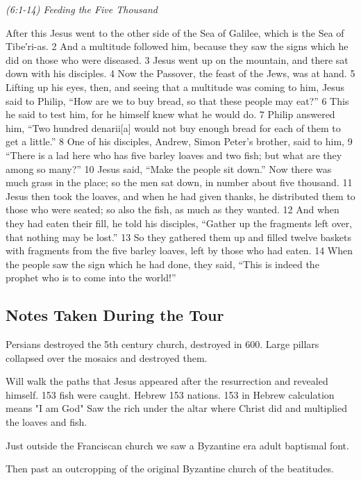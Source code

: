 \documentclass[letterpaper]{report}
\begin{document}
{\centering
	\emph{(6:1-14) Feeding the Five Thousand}\\
}
\begin{multicols}{2}
After this Jesus went to the other side of the Sea of Galilee, which is the Sea of Tibe′ri-as. 2 And a multitude followed him, because they saw the signs which he did on those who were diseased. 3 Jesus went up on the mountain, and there sat down with his disciples. 4 Now the Passover, the feast of the Jews, was at hand. 5 Lifting up his eyes, then, and seeing that a multitude was coming to him, Jesus said to Philip, “How are we to buy bread, so that these people may eat?” 6 This he said to test him, for he himself knew what he would do. 7 Philip answered him, “Two hundred denarii[a] would not buy enough bread for each of them to get a little.” 8 One of his disciples, Andrew, Simon Peter’s brother, said to him, 9 “There is a lad here who has five barley loaves and two fish; but what are they among so many?” 10 Jesus said, “Make the people sit down.” Now there was much grass in the place; so the men sat down, in number about five thousand. 11 Jesus then took the loaves, and when he had given thanks, he distributed them to those who were seated; so also the fish, as much as they wanted. 12 And when they had eaten their fill, he told his disciples, “Gather up the fragments left over, that nothing may be lost.” 13 So they gathered them up and filled twelve baskets with fragments from the five barley loaves, left by those who had eaten. 14 When the people saw the sign which he had done, they said, “This is indeed the prophet who is to come into the world!”
\end{multicols}

\subsection{Notes Taken During the Tour}
Persians destroyed the 5th century church, destroyed in 600. Large pillars collapsed over the mosaics and destroyed them.

Will walk the paths that Jesus appeared after the resurrection and revealed himself.
153 fish were caught.
Hebrew 153 nations. 153 in Hebrew calculation means "I am God"
Saw the rich under the altar where Christ did and multiplied the loaves and fish.

Just outside the Franciscan church we saw a Byzantine era adult  baptismal font.

Then past an outcropping of the original Byzantine church of the beatitudes.
\end{document}
